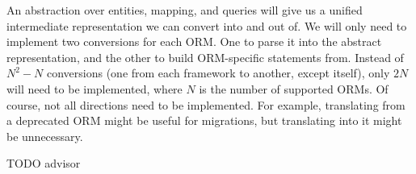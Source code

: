 An abstraction over entities, mapping, and queries will give us a unified intermediate representation we can convert into and out of. We will only need to implement two conversions for each ORM. One to parse it into the abstract representation, and the other to build ORM-specific statements from. Instead of $N^2 - N$ conversions (one from each framework to another, except itself), only $2N$ will need to be implemented, where $N$ is the number of supported ORMs. Of course, not all directions need to be implemented. For example, translating from a deprecated ORM might be useful for migrations, but translating into it might be unnecessary.

TODO advisor